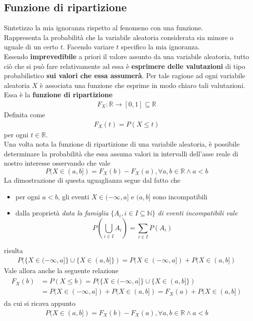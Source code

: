 \subsection{Funzione di ripartizione}
Sintetizzo la mia ignoranza rispetto al fenomeno con una funzione. \\
Rappresenta la probabilità che la variabile aleatoria considerata sia minore o uguale di un certo $t$. Facendo variare $t$ specifico la mia ignoranza. \\
Essendo \textbf{imprevedibile }a priori il valore assunto da una variabile aleatoria, tutto ciò che si può fare relativamente ad essa è \textbf{esprimere delle valutazioni }di tipo probabilistico \textbf{sui valori che essa assumerà}.
Per tale ragione ad ogni variabile aleatoria $X$ è associata una funzione che esprime in modo chiaro tali valutazioni. \\
Essa è la \textbf{funzione di ripartizione}
\begin{align}
	F_X : \mathbb{R} \rightarrow [0, 1] \subseteq \mathbb{R}
\end{align}
Definita come 
\begin{align}
	F_X(t) = P(X \leq t)
\end{align}
per ogni $t \in \mathbb{R}$. \\
Una volta nota la funzione di ripartizione di una variabile aleatoria, è possibile determinare la probabilità che essa assuma valori in intervalli dell’asse reale di nostro interesse osservando che vale
\begin{equation}
	P(X \in (a, b]) = F_X(b) - F_X(a), \forall a, b \in \mathbb{R} \wedge  a < b 
\end{equation}
La dimostrazione di questa uguaglianza segue dal fatto che
\begin{itemize}
	\item per ogni $a < b$, gli eventi $X \in (-\infty, a]$ e $(a, b]$ sono incompatibili 
	\item dalla proprietà
	\textit{data la famiglia} $\{ A_i, i \in I \subseteq \mathbb{N} \}$ \textit{di eventi incompatibili vale}
	\[
	P(\bigcup_{i \in I} A_i) = \sum_{i \in I} P(A_i)
	\]
\end{itemize}
risulta
\begin{align}
	P(\{  X \in (-\infty, a]   \} \cup \{ X \in (a, b]  \}) = P(  X \in (-\infty, a]   ) + P (X \in (a, b]  )
\end{align}
Vale allora anche la seguente relazione
\begin{align}
\begin{split}
	F_X(b) &= P(X \leq b) = P(\{X \in (-\infty, a]\} \cup \{X \in (a, b]\}) \\
	&= P(X \in (-\infty, a]) + P(X \in (a, b]) = F_X(a) + P(X \in (a, b])
\end{split}
\end{align}
da cui si ricava appunto
\begin{align}
	P(X \in (a, b]) = F_X(b) - F_X(a), \forall a, b \in \mathbb{R} \wedge a < b
\end{align}

